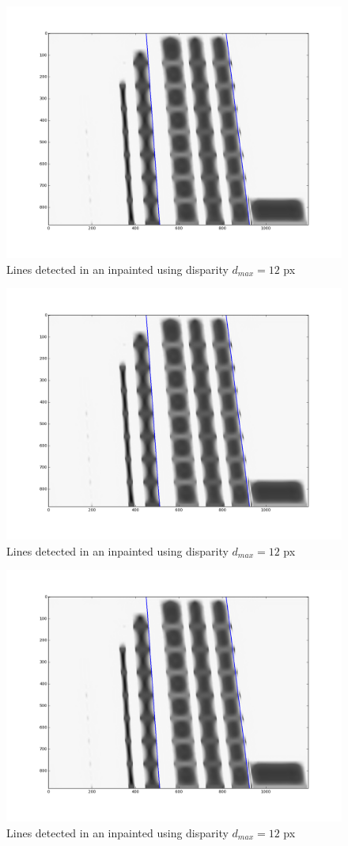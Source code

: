 \begin{itemize}
\begin{figure}[h!]
\centering
\includegraphics[width = 0.7 \textwidth]{./Diagrams/results/Disparity_benchmark/673_10_102_12_48_8_lines.png}
\caption{Lines detected in an inpainted using disparity $d_{max} = 12$ px}
\label{fig:fourth_lines_disparity}
\end{figure}

\begin{figure}[h!]
\centering
\includegraphics[width = 0.7 \textwidth]{./Diagrams/results/Disparity_benchmark/673_10_102_12_48_8_lines.png}
\caption{Lines detected in an inpainted using disparity $d_{max} = 12$ px}
\label{fig:fourth_lines_disparity}
\end{figure}

\begin{figure}[h!]
\centering
\includegraphics[width = 0.7 \textwidth]{./Diagrams/results/Disparity_benchmark/673_10_102_12_48_8_lines.png}
\caption{Lines detected in an inpainted using disparity $d_{max} = 12$ px}
\label{fig:fourth_lines_disparity}
\end{figure}


\end{itemize}
